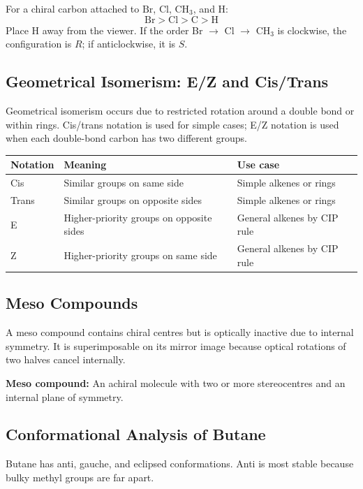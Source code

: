 \documentclass[12pt,a4paper]{article}
\begin{document}
\begin{tcolorbox}[examplebox, title={Worked Method: R/S Assignment}]
For a chiral carbon attached to $\mathrm{Br}$, $\mathrm{Cl}$, $\mathrm{CH_3}$, and $\mathrm{H}$:
\[
\mathrm{Br}>\mathrm{Cl}>\mathrm{C}>\mathrm{H}
\]
Place $\mathrm{H}$ away from the viewer. If the order Br $\rightarrow$ Cl $\rightarrow$ $\mathrm{CH_3}$ is clockwise, the configuration is $R$; if anticlockwise, it is $S$.
\end{tcolorbox}

\subsection{Geometrical Isomerism: E/Z and Cis/Trans}
Geometrical isomerism occurs due to restricted rotation around a double bond or within rings. Cis/trans notation is used for simple cases; E/Z notation is used when each double-bond carbon has two different groups.

\begin{tabularx}{\linewidth}{|B{3.2cm}|Y|Y|}
\hline
\textbf{Notation} & \textbf{Meaning} & \textbf{Use case} \\
\hline
Cis & Similar groups on same side & Simple alkenes or rings \\
\hline
Trans & Similar groups on opposite sides & Simple alkenes or rings \\
\hline
E & Higher-priority groups on opposite sides & General alkenes by CIP rule \\
\hline
Z & Higher-priority groups on same side & General alkenes by CIP rule \\
\hline
\end{tabularx}

\subsection{Meso Compounds}
A meso compound contains chiral centres but is optically inactive due to internal symmetry. It is superimposable on its mirror image because optical rotations of two halves cancel internally.

\begin{tcolorbox}[defbox]
\textbf{Meso compound:} An achiral molecule with two or more stereocentres and an internal plane of symmetry.
\end{tcolorbox}

\subsection{Conformational Analysis of Butane}
Butane has anti, gauche, and eclipsed conformations. Anti is most stable because bulky methyl groups are far apart.
\end{document}
